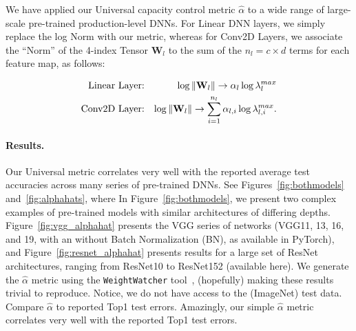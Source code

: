 We have applied our Universal capacity control metric $\hat{\alpha}$ to a wide range of large-scale pre-trained production-level DNNs.
For Linear DNN layers, 
we 
simply replace the log Norm with our metric, whereas for Conv2D Layers, 
we 
associate the ``Norm'' of the 4-index Tensor $\mathbf{W}_{l}$ to the sum of the $n_{l}=c\times d$ terms for each feature map, as follows:

\vspace{-2mm}
\begin{eqnarray*}
\text{Linear Layer:} & & \log\Vert\mathbf{W}_{l}\Vert
\rightarrow 
\alpha_{l}\log\lambda_{l}^{max}  \\
\text{Conv2D Layer:} & & \log\Vert\mathbf{W}_{l}\Vert
\rightarrow 
\sum_{i=1}^{n_{l}}\alpha_{l,i} \log\lambda_{l,i}^{max} .
\vspace{-1mm}
\end{eqnarray*}

\vspace{-2mm}
\paragraph{Results.} 
Our Universal metric correlates very well with the reported average test accuracies across many series of pre-trained DNNs.
See Figures~\ref{fig:bothmodels} and~\ref{fig:alphahats}, where
In Figure~\ref{fig:bothmodels}, we present two complex examples of pre-trained models with similar architectures of differing depths.  
Figure~\ref{fig:vgg_alphahat} presents the VGG series of networks (VGG11, 13, 16, and 19, with an without Batch Normalization (BN), as available in PyTorch), and 
Figure~\ref{fig:resnet_alphahat} presents results for a large set of ResNet architectures, ranging from ResNet10 to ResNet152 (available here). 
We generate the $\hat{\alpha}$ metric using the \texttt{WeightWatcher} tool~\cite{weightwatcher_package_justURL}, (hopefully) making these results trivial to reproduce.
Notice, we do not have access to the (ImageNet) test data.
Compare $\hat{\alpha}$ to reported Top1 test errors. 
Amazingly, our simple $\hat{\alpha}$ metric correlates very well with the reported Top1 test errors. 
  
